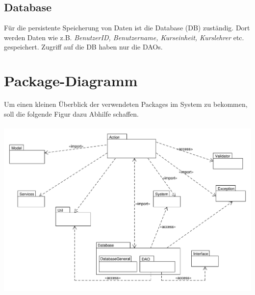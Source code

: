     \subsection{Database}
    Für die persistente Speicherung von Daten ist die Database (DB) zuständig. Dort werden Daten wie z.B. \textit{BenutzerID, Benutzername, Kurseinheit, Kurslehrer} etc. gespeichert. Zugriff auf die DB haben nur die DAOs. 

\section{Package-Diagramm}
 Um einen kleinen Überblick der verwendeten Packages im System zu bekommen, soll die folgende Figur dazu Abhilfe schaffen. \\ \\
\includegraphics[scale=0.45]{Grafiken/PackageDiagramm.pdf}      
    
